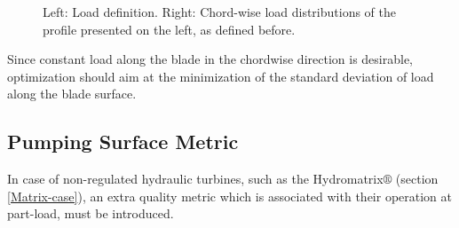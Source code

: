 \begin{figure}[h!]
\begin{minipage}[b]{0.5\linewidth}
 \centering
\end{minipage}
\begin{minipage}[b]{0.5\linewidth}
 \centering
\end{minipage}
\caption{Left: Load definition. Right: Chord-wise load distributions of the profile presented on the left, as defined before.}
\label{design-obj}
\end{figure}

Since constant load along the blade in the chordwise direction is desirable, optimization should aim at the minimization of the standard deviation of load along the blade surface. 


\subsection{Pumping Surface Metric}
In case of non-regulated hydraulic turbines, such as the Hydromatrix$\circledR$ (section \ref{Matrix-case}), an extra quality metric which is associated with their operation at part-load, must be introduced.      


